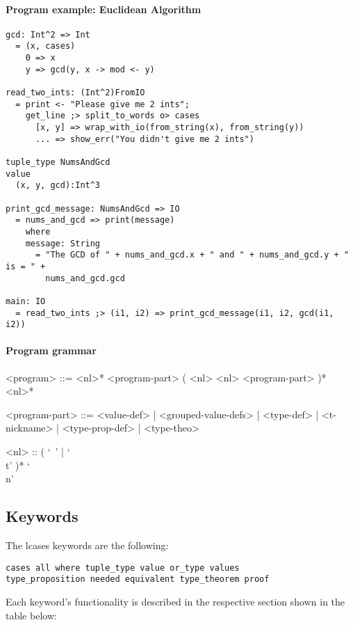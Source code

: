 \documentclass{article}
\begin{document}
\paragraph{Program example: Euclidean Algorithm}
\begin{verbatim}
gcd: Int^2 => Int
  = (x, cases)
    0 => x
    y => gcd(y, x -> mod <- y) 

read_two_ints: (Int^2)FromIO
  = print <- "Please give me 2 ints";
    get_line ;> split_to_words o> cases
      [x, y] => wrap_with_io(from_string(x), from_string(y))
      ... => show_err("You didn't give me 2 ints")

tuple_type NumsAndGcd
value
  (x, y, gcd):Int^3

print_gcd_message: NumsAndGcd => IO
  = nums_and_gcd => print(message)
    where
    message: String
      = "The GCD of " + nums_and_gcd.x + " and " + nums_and_gcd.y + " is = " +
        nums_and_gcd.gcd

main: IO
  = read_two_ints ;> (i1, i2) => print_gcd_message(i1, i2, gcd(i1, i2))
\end{verbatim}

\paragraph{Program grammar}
\begin{grammar}
<program> ::=
<nl>* <program-part> ( <nl> <nl> <program-part> )* <nl>*

<program-part> ::=
<value-def> | <grouped-value-defs> | <type-def> | <t-nickname> | <type-prop-def> |
<type-theo>

<nl> :: ( `\ ' | `\\t' )* `\\n'
\end{grammar}

\subsection{Keywords}

The lcases keywords are the following:
\begin{verbatim}
cases all where tuple_type value or_type values
type_proposition needed equivalent type_theorem proof
\end{verbatim}
Each keyword's functionality is described in the respective section shown in the 
table below:
\end{document}

